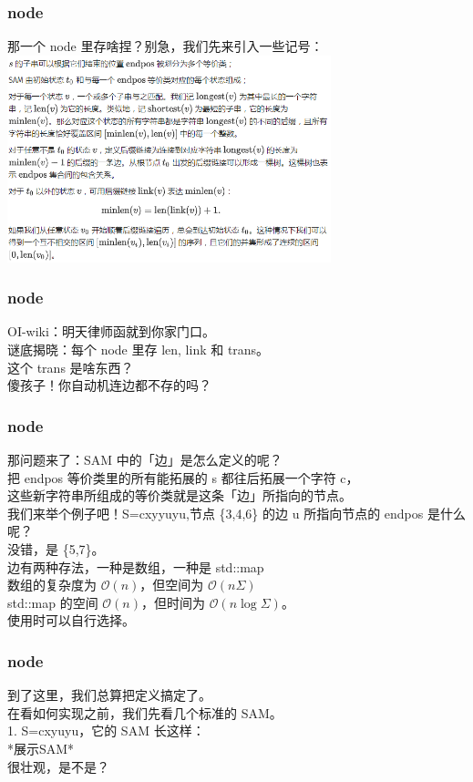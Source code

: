 \documentclass{beamer}
\begin{document}
    \begin{frame}
        \frametitle{node}
        那一个 node 里存啥捏？别急，我们先来引入一些记号：\\
        \includegraphics[height=6cm]{g6.png}
    \end{frame}

    \begin{frame}
        \frametitle{node}
        OI-wiki：明天律师函就到你家门口。\\
        谜底揭晓：每个 node 里存 len, link 和 trans。\\
        这个 trans 是啥东西？\\ 
        傻孩子！你自动机连边都不存的吗？
    \end{frame}

    \begin{frame}
        \frametitle{node}
        那问题来了：SAM 中的「边」是怎么定义的呢？\\
        把 endpos 等价类里的所有能拓展的 s 都往后拓展一个字符 c，\\
        这些新字符串所组成的等价类就是这条「边」所指向的节点。\\
        我们来举个例子吧！S=cxyyuyu,节点 \{3,4,6\} 的边 u 所指向节点的 endpos 是什么呢？\\
        \pause
        没错，是 \{5,7\}。\\
        边有两种存法，一种是数组，一种是 std::map\\
        数组的复杂度为 $\mathcal{O}(n)$，但空间为 $\mathcal{O}(n\Sigma)$\\
        std::map 的空间 $\mathcal{O}(n)$，但时间为 $\mathcal{O}(n\log\Sigma)$。\\
        使用时可以自行选择。  
    \end{frame}

    \begin{frame}
        \frametitle{node}
        到了这里，我们总算把定义搞定了。\\
        在看如何实现之前，我们先看几个标准的 SAM。\\
        1. S=cxyuyu，它的 SAM 长这样：\\
        *展示SAM*\\
        很壮观，是不是？
    \end{frame}
\end{document}
